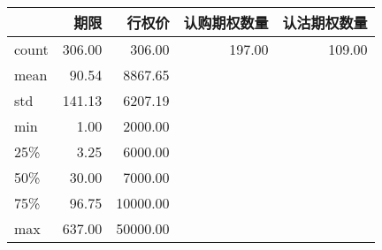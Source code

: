 \begin{tabular}{lrrrr}
\toprule
{} &     期限 &      行权价 &  认购期权数量 &  认沽期权数量 \\
\midrule
count & 306.00 &   306.00 &  197.00 &  109.00 \\
mean  &  90.54 &  8867.65 &         &         \\
std   & 141.13 &  6207.19 &         &         \\
min   &   1.00 &  2000.00 &         &         \\
25\%   &   3.25 &  6000.00 &         &         \\
50\%   &  30.00 &  7000.00 &         &         \\
75\%   &  96.75 & 10000.00 &         &         \\
max   & 637.00 & 50000.00 &         &         \\
\bottomrule
\end{tabular}
